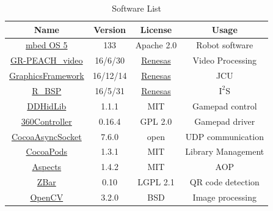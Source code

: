\documentclass[journal]{IEEEtran}
\begin{document}
\begin{table}
\renewcommand{\arraystretch}{1}
 \tabcolsep=0.1cm

\caption{Software List}
\label{tbl:software_list}
\centering
\begin{tabular}{|c|c|c|c|}
\hline
Name & Version & License & Usage \\
\hline
 \href{https://www.mbed.com/en/}{mbed OS 5} & 133 & Apache 2.0 & Robot software \\
 \href{https://developer.mbed.org/teams/Renesas/code/GR-PEACH_video/}{GR-PEACH\_video} & 16/6/30 & \href{https://os.mbed.com/teams/Renesas/wiki/About-LICENSE}{Renesas} & Video Processing \\
 \href{https://developer.mbed.org/teams/Renesas/code/GraphicsFramework/}{GraphicsFramework} & 16/12/14 & \href{https://os.mbed.com/teams/Renesas/wiki/About-LICENSE}{Renesas} & JCU \\
 \href{https://developer.mbed.org/teams/Renesas/code/R_BSP/}{R\_BSP} & 16/5/31 & \href{https://os.mbed.com/teams/Renesas/wiki/About-LICENSE}{Renesas} & \(\mathrm{I^2S}\) \\
 \href{https://github.com/Daij-Djan/DDHidLib}{DDHidLib} & 1.1.1 & MIT & Gamepad control \\
 \href{https://github.com/360Controller/360Controller}{360Controller} & 0.16.4 & GPL 2.0 & Gamepad driver \\
 \href{https://github.com/robbiehanson/CocoaAsyncSocket}{CocoaAsyncSocket} & 7.6.0 & open & UDP communication \\
 \href{https://github.com/CocoaPods/CocoaPods}{CocoaPods} & 1.3.1 & MIT & Library Management \\
 \href{https://github.com/steipete/Aspects}{Aspects} & 1.4.2 & MIT & AOP \\
 \href{http://zbar.sourceforge.net}{ZBar} & 0.10 & LGPL 2.1 & QR code detection \\
 \href{http://opencv.org}{OpenCV} & 3.2.0 & BSD & Image processing \\
\hline
\end{tabular}
\end{table}
\end{document}
